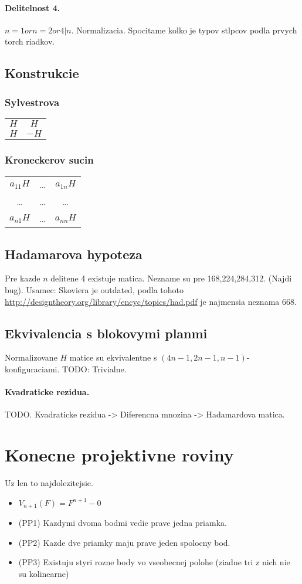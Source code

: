 \documentclass[10pt,a4paper]{article}
\begin{document}
\paragraph{Delitelnost 4.}
$n=1 or n=2 or 4|n$. Normalizacia. Spocitame kolko je typov stlpcov podla prvych torch riadkov. 

\subsection{Konstrukcie}
\subsubsection{Sylvestrova}
\begin{tabular}{c c}
$H$ & $H$ \\
$H$ & $-H$ \\
\end{tabular}
\subsubsection{Kroneckerov sucin}
\begin{tabular}{c c c}
$a_{11}H$ & \ldots & $a_{1n}H$ \\
\ldots & \ldots & \ldots \\
$a_{n1}H$ & \ldots & $a_{nn}H$ 
\end{tabular}

\subsection{Hadamarova hypoteza}
Pre kazde $n$ delitene 4 existuje matica.
Nezname su pre 168,224,284,312. (Najdi bug).
Usamec: Skoviera je outdated, podla tohoto
\url{http://designtheory.org/library/encyc/topics/had.pdf} je najmensia neznama 668. 

\subsection{Ekvivalencia s blokovymi planmi}
Normalizovane $H$ matice su ekvivalentne s $(4n-1, 2n-1, n-1)$-konfiguraciami. 
TODO: Trivialne. 

\paragraph{Kvadraticke rezidua.}
TODO. Kvadraticke rezidua -> Diferencna mnozina -> Hadamardova matica. 

\section{Konecne projektivne roviny}
Uz len to najdolezitejsie. 
\begin{itemize}
\item $V_{n+1}(F) = F^{n+1} - {0}$
\item (PP1) Kazdymi dvoma bodmi vedie prave jedna priamka.
\item (PP2) Kazde dve priamky maju prave jeden spolocny bod. 
\item (PP3) Existuju styri rozne body vo vseobecnej polohe (ziadne tri z nich nie su kolinearne)
\end{itemize}
\end{document}
